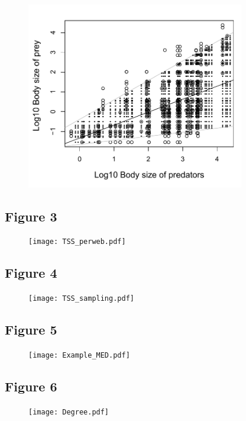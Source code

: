 \documentclass[12pt]{article}
\begin{document}
\begin{figure}[ht!]
	\centering\includegraphics[width=0.85\textwidth]{Example.pdf}
\end{figure}

\newpage
\subsection*{Figure 3}

\begin{figure}[ht!]
	\centering\texttt{[image: TSS\_perweb.pdf]}
\end{figure}

\newpage
\subsection*{Figure 4}

\begin{figure}[ht!]
	\centering\texttt{[image: TSS\_sampling.pdf]}
\end{figure}

\newpage
\subsection*{Figure 5}

\begin{figure}[ht!]
	\centering\texttt{[image: Example\_MED.pdf]}
\end{figure}

\newpage
\subsection*{Figure 6}

\begin{figure}[ht!]
	\centering\texttt{[image: Degree.pdf]}
\end{figure}
\end{document}
